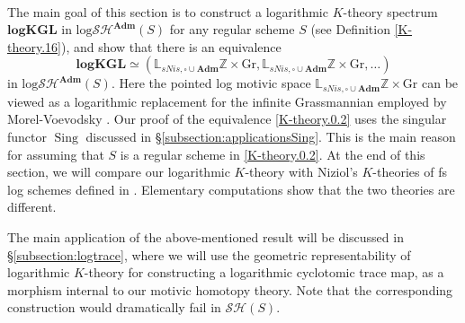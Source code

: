 \documentclass[11pt, a4paper]{amsart}
\theoremstyle{definition}
\numberwithin{equation}{subsection}
\newcommand{\Z}{\mathbb{Z}}
\newcommand{\bbL}{\mathbb{L}}
\newcommand{\Sing}{\operatorname{Sing}}              %
\newcommand{\Gr}{{\mathrm{Gr}}}
\newcommand{\Adm}{\mathbf{Adm}}
\newcommand{\logKGL}{\mathbf{logKGL}}
\newcommand{\boxx}{\square}
\newcommand{\inflogSH}{\mathrm{log}\mathcal{SH}}
\begin{document}
\

The main goal of this section is to construct a logarithmic $K$-theory spectrum $\logKGL$ in $\inflogSH^\Adm(S)$ for any 
regular scheme $S$  (see Definition \ref{K-theory.16}), and 
show  that there is an equivalence
\begin{equation}
\label{K-theory.0.2}
\logKGL
\simeq
(\bbL_{sNis,\boxx\cup \Adm}\Z\times \Gr,\bbL_{sNis,\boxx\cup \Adm}\Z\times \Gr,\ldots)
\end{equation}
in $\inflogSH^\Adm(S)$.
Here the pointed log motivic space $\bbL_{sNis,\boxx\cup \Adm}\Z\times \Gr$ can be viewed as a 
logarithmic replacement for the infinite Grassmannian employed by Morel-Voevodsky \cite{MV}.
Our proof of the equivalence \eqref{K-theory.0.2} uses the singular functor $\Sing$ discussed 
in \S\ref{subsection:applicationsSing}. 
This is the main reason for assuming that $S$ is a regular scheme
in \eqref{K-theory.0.2}.  At the end of this  section,  
we will compare our logarithmic $K$-theory with Niziol's $K$-theories of fs log schemes defined in \cite{MR2452875}.
Elementary computations 
show that the two theories are different.

The main application of the above-mentioned result will be
discussed in \S\ref{subsection:logtrace}, where we will use the geometric representability of logarithmic $K$-theory 
for constructing a logarithmic cyclotomic trace map, as a morphism internal to our motivic homotopy theory. Note that the corresponding construction would dramatically fail in $\mathcal{SH}(S)$. 
\end{document}
